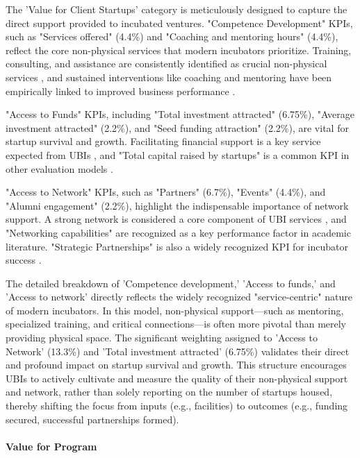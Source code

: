 \documentclass[../Main.tex]{subfiles}
\begin{document}
The 'Value for Client Startups' category is meticulously designed to capture the direct support provided to incubated ventures. "Competence Development" KPIs, such as "Services offered" (4.4\%) and "Coaching and mentoring hours" (4.4\%), reflect the core non-physical services that modern incubators prioritize. Training, consulting, and assistance are consistently identified as crucial non-physical services , and sustained interventions like coaching and mentoring have been empirically linked to improved business performance \cite{Halaby_DeterminingViability,UBI_KeyFactors,Canada_BAIPerformance}.

"Access to Funds" KPIs, including "Total investment attracted" (6.75\%), "Average investment attracted" (2.2\%), and "Seed funding attraction" (2.2\%), are vital for startup survival and growth. Facilitating financial support is a key service expected from UBIs , and "Total capital raised by startups" is a common KPI in other evaluation models \cite{UBI_KeyFactors,QuickersVenture_IncubatorKPI}.

"Access to Network" KPIs, such as "Partners" (6.7\%), "Events" (4.4\%), and "Alumni engagement" (2.2\%), highlight the indispensable importance of network support. A strong network is considered a core component of UBI services , and "Networking capabilities" are recognized as a key performance factor in academic literature. "Strategic Partnerships" is also a widely recognized KPI for incubator success \cite{UBI_KeyFactors,Gerdsri2021Capability}.

The detailed breakdown of 'Competence development,' 'Access to funds,' and 'Access to network' directly reflects the widely recognized "service-centric" nature of modern incubators. In this model, non-physical support—such as mentoring, specialized training, and critical connections—is often more pivotal than merely providing physical space. The significant weighting assigned to 'Access to Network' (13.3\%) and 'Total investment attracted' (6.75\%) validates their direct and profound impact on startup survival and growth. This structure encourages UBIs to actively cultivate and measure the quality of their non-physical support and network, rather than solely reporting on the number of startups housed, thereby shifting the focus from inputs (e.g., facilities) to outcomes (e.g., funding secured, successful partnerships formed).

\paragraph{Value for Program}
\end{document}
